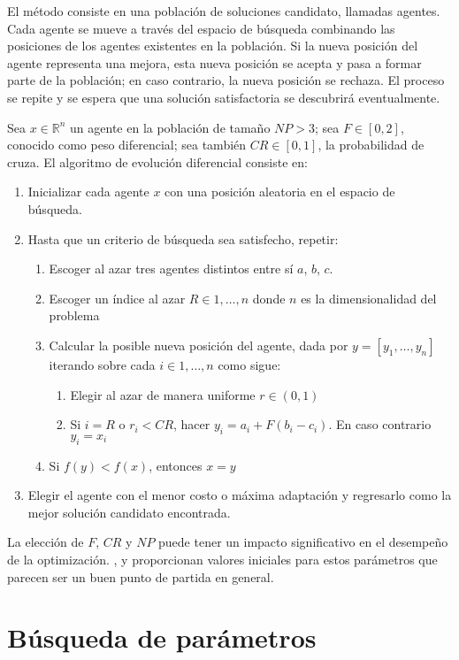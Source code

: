 El método consiste en una población de soluciones candidato, llamadas agentes. Cada agente se mueve a través del espacio de búsqueda combinando las posiciones de los agentes existentes en la población. Si la nueva posición del agente representa una mejora, esta nueva posición se acepta y pasa a formar parte de la población; en caso contrario, la nueva posición se rechaza. El proceso se repite y se espera que una solución satisfactoria se descubrirá eventualmente.

Sea $x \in \mathbb{R}^n$ un agente en la población de tamaño $NP>3$; sea $F \in [0,2]$, conocido como peso diferencial; sea también $CR \in [0,1]$, la probabilidad de cruza. El algoritmo de evolución diferencial consiste en:
\begin{enumerate}
\item Inicializar cada agente $x$ con una posición aleatoria en el espacio de búsqueda.
\item Hasta que un criterio de búsqueda sea satisfecho, repetir:
	\begin{enumerate}
		\item Escoger al azar tres agentes distintos entre sí $a$, $b$, $c$.
		\item Escoger un índice al azar $R \in {1,\ldots,n}$ donde $n$ es la dimensionalidad del problema
		\item Calcular la posible nueva posición del agente, dada por $y=[y_1,\ldots,y_n]$ iterando sobre cada $i \in {1,\ldots,n}$ como sigue:
			\begin{enumerate}
				\item Elegir al azar de manera uniforme $r \in (0,1)$
				\item Si $i=R$ o $r_i<CR$, hacer $y_i=a_i+F(b_i-c_i)$. En caso contrario $y_i=x_i$
			\end{enumerate}
		\item Si $f(y)<f(x)$, entonces $x=y$
	\end{enumerate}
\item Elegir el agente con el menor costo o máxima adaptación y regresarlo como la mejor solución candidato encontrada.
\end{enumerate}

La elección de $F$, $CR$ y $NP$ puede tener un impacto significativo en el desempeño de la optimización. \citeauthor{Storn1997}  \citep{Storn1997}, y \citeauthor{lampinen2002} \citep{lampinen2002} proporcionan valores iniciales para estos parámetros que parecen ser un buen punto de partida en general.

\section{Búsqueda de parámetros}

